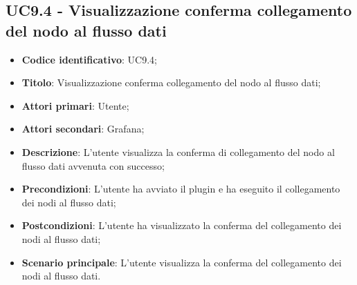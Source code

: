 \subsection{UC9.4 - Visualizzazione conferma collegamento del nodo al flusso dati}
\begin{itemize}
	\item \textbf{Codice identificativo}: UC9.4;
	\item \textbf{Titolo}: Visualizzazione conferma collegamento del nodo al flusso dati;
	\item \textbf{Attori primari}: Utente;
	\item \textbf{Attori secondari}: Grafana\glo;
	\item \textbf{Descrizione}: L'utente visualizza la conferma di collegamento del nodo al flusso dati avvenuta con successo;
	\item \textbf{Precondizioni}: L'utente ha avviato il plugin e ha eseguito il collegamento dei nodi al flusso dati;
	\item \textbf{Postcondizioni}: L'utente ha visualizzato la conferma del collegamento dei nodi al flusso dati;
	\item \textbf{Scenario principale}: L'utente visualizza la conferma del collegamento dei nodi al flusso dati.
\end{itemize}
